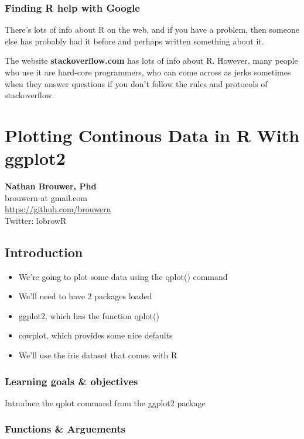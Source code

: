 \documentclass[]{book}
\providecommand{\tightlist}{%
  \setlength{\itemsep}{0pt}\setlength{\parskip}{0pt}}
\theoremstyle{definition}
\theoremstyle{definition}
\theoremstyle{definition}
\theoremstyle{remark}
\begin{document}
\subsection{Finding R help with
Google}\label{finding-r-help-with-google}

There's lots of info about R on the web, and if you have a problem, then
someone else has probably had it before and perhaps written something
about it.

The website \textbf{stackoverflow.com} has lots of info about R.
However, many people who use it are hard-core programmers, who can come
across as jerks sometimes when they answer questions if you don't follow
the rules and protocols of stackoverflow.

\chapter{Plotting Continous Data in R With
ggplot2}\label{plotting-continous-data-in-r-with-ggplot2}

\textbf{Nathan Brouwer, Phd}\\
brouwern at gmail.com\\
\url{https://github.com/brouwern}\\
Twitter: lobrowR

\section{Introduction}\label{introduction-6}

\begin{itemize}
\tightlist
\item
  We're going to plot some data using the qplot() command
\item
  We'll need to have 2 packages loaded
\item
  ggplot2, which has the function qplot()
\item
  cowplot, which provides some nice defaults
\item
  We'll use the iris dataset that comes with R
\end{itemize}

\subsection{Learning goals \&
objectives}\label{learning-goals-objectives}

Introduce the qplot command from the ggplot2 package

\subsection{Functions \& Arguements}\label{functions-arguements-4}
\end{document}
